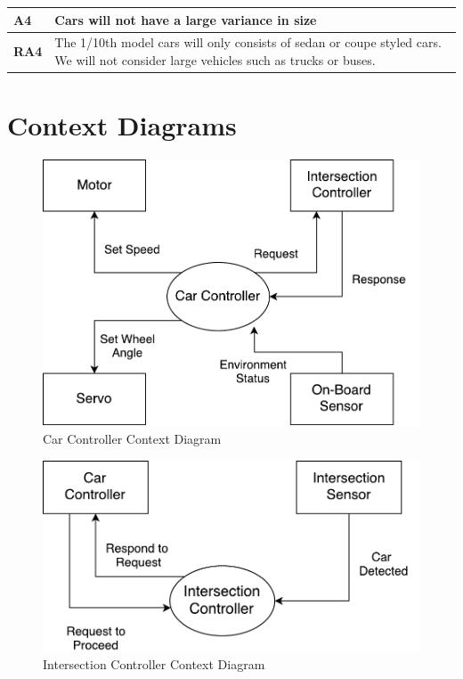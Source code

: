 \documentclass [11pt]{article}
\begin{document}
\begin{longtable}{| p{ } | p{ } | }\hline 
\textbf{A4} & \textbf{Cars will not have a large variance in size} \\ \hline
\textbf{RA4} &  The 1/10th model cars will only consists of sedan or coupe styled cars. We will not consider large vehicles such as trucks or buses.\\ \hline
\end{longtable}


\section{Context Diagrams}

\begin{figure} [h!]
	\centering
	\includegraphics [scale =0.8] {figures/CarCtrl_ContextDiag.pdf}
	\caption{Car Controller Context Diagram}
\end{figure}

\break

\begin{figure} [h!]
	\centering
	\includegraphics [scale = 0.8] {figures/IC_ContextDiagram.pdf}
	\caption{Intersection Controller Context Diagram}
\end{figure}
\end{document}
